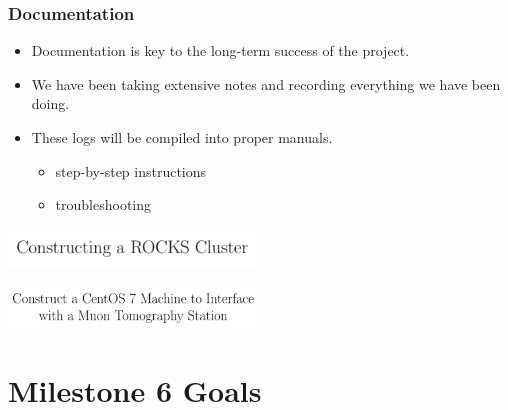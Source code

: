 \documentclass[aspectratio=169]{beamer}
\begin{document}
\begin{frame}

  \frametitle{Documentation}

  \begin{itemize}
  \item Documentation is key to the long-term success of the project.
  \item We have been taking extensive notes and recording everything we have
    been doing.
  \item These logs will be compiled into proper manuals.
    \begin{itemize}
    \item step-by-step instructions
    \item troubleshooting
    \end{itemize}
  \end{itemize}
  
  \begin{multicols}{2}
    
    \begin{center}
      \includegraphics[width=0.5\textwidth]{clusterDoc.png}
    \end{center}

    \columnbreak
    
    \begin{center}
      \includegraphics[width=0.5\textwidth]{mtsDoc.png}
    \end{center}

  \end{multicols}

\end{frame}



\section{Milestone 6 Goals}
\end{document}
